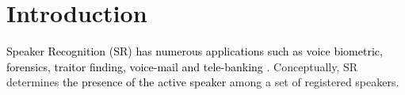\documentclass{article}
\begin{document}
\section{\textbf{{Introduction}}}
\label{Intro}
\textcolor{black}{Speaker Recognition (SR) has numerous applications such as voice biometric, forensics, traitor finding, voice-mail and  tele-banking \cite{1}}. Conceptually, SR determines \textcolor{black}{the presence of the active speaker} among a set of registered speakers. %
\end{document}
